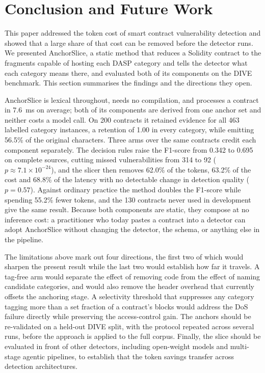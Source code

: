 \documentclass{ieeeaccess}
\begin{document}
\section{Conclusion and Future Work}\label{sec:conclusion}
This paper addressed the token cost of smart contract vulnerability detection and showed that a large share of that cost can be removed before the detector runs. We presented AnchorSlice, a static method that reduces a Solidity contract to the fragments capable of hosting each DASP category and tells the detector what each category means there, and evaluated both of its components on the DIVE benchmark. This section summarises the findings and the directions they open.

AnchorSlice is lexical throughout, needs no compilation, and processes a contract in 7.6~ms on average; both of its components are derived from one anchor set and neither costs a model call. On 200 contracts it retained evidence for all 463 labelled category instances, a retention of 1.00 in every category, while emitting 56.5\% of the original characters. Three arms over the same contracts credit each component separately. The decision rules raise the F1-score from 0.342 to 0.695 on complete sources, cutting missed vulnerabilities from 314 to 92 ($p \approx 7.1 \times 10^{-24}$), and the slicer then removes 62.0\% of the tokens, 63.2\% of the cost and 68.8\% of the latency with no detectable change in detection quality ($p = 0.57$). Against ordinary practice the method doubles the F1-score while spending 55.2\% fewer tokens, and the 130 contracts never used in development give the same result. Because both components are static, they compose at no inference cost: a practitioner who today pastes a contract into a detector can adopt AnchorSlice without changing the detector, the schema, or anything else in the pipeline.

The limitations above mark out four directions, the first two of which would sharpen the present result while the last two would establish how far it travels. A tag-free arm would separate the effect of removing code from the effect of naming candidate categories, and would also remove the header overhead that currently offsets the anchoring stage. A selectivity threshold that suppresses any category tagging more than a set fraction of a contract's blocks would address the DoS failure directly while preserving the access-control gain. The anchors should be re-validated on a held-out DIVE split, with the protocol repeated across several runs, before the approach is applied to the full corpus. Finally, the slice should be evaluated in front of other detectors, including open-weight models and multi-stage agentic pipelines, to establish that the token savings transfer across detection architectures.
\end{document}

